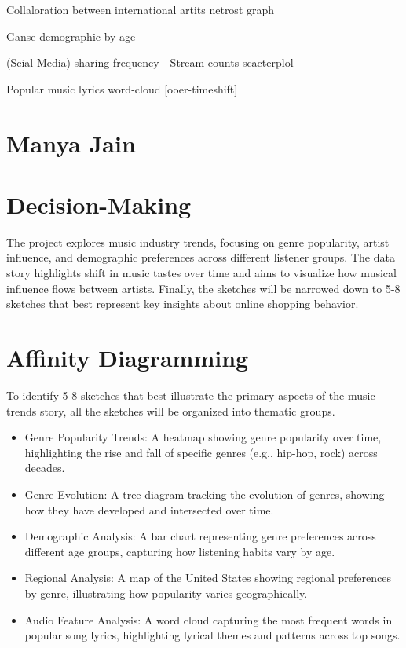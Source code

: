 \documentclass[12pt]{article}
\begin{document}
Collaloration between international artits netrost graph\\



Ganse demographic by age\\

(Scial Media) sharing frequency - Stream counts scacterplol\\

Popular music lyrics word-cloud [ooer-timeshift]\\

\section*{Manya Jain}

\section*{Decision-Making}
The project explores music industry trends, focusing on genre popularity, artist influence, and demographic preferences across different listener groups. The data story highlights shift in music tastes over time and aims to visualize how musical influence flows between artists. Finally, the sketches will be narrowed down to 5-8 sketches that best represent key insights about online shopping behavior.

\section*{Affinity Diagramming}
To identify 5-8 sketches that best illustrate the primary aspects of the music trends story, all the sketches will be organized into thematic groups.

\begin{itemize}
  \item Genre Popularity Trends: A heatmap showing genre popularity over time, highlighting the rise and fall of specific genres (e.g., hip-hop, rock) across decades.
  \item Genre Evolution: A tree diagram tracking the evolution of genres, showing how they have developed and intersected over time.
  \item Demographic Analysis: A bar chart representing genre preferences across different age groups, capturing how listening habits vary by age.
  \item Regional Analysis: A map of the United States showing regional preferences by genre, illustrating how popularity varies geographically.
  \item Audio Feature Analysis: A word cloud capturing the most frequent words in popular song lyrics, highlighting lyrical themes and patterns across top songs.
\end{itemize}
\end{document}
